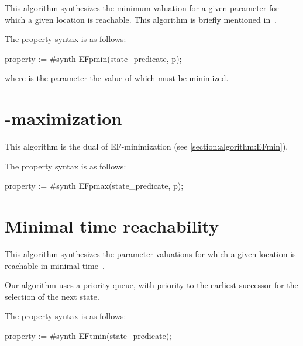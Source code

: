 This algorithm synthesizes the minimum valuation for a given parameter for which a given location is reachable.
This algorithm is briefly mentioned in~\cite{ABPV19}.

The property syntax is as follows:

\begin{IMITATORproperty}
property := #synth EFpmin(state_predicate, p);
\end{IMITATORproperty}

where  is the parameter the value of which must be minimized.



\section{-maximization}\label{section:algorithm:EFmax}

This algorithm is the dual of EF-minimization (see \cref{section:algorithm:EFmin}).

The property syntax is as follows:

\begin{IMITATORproperty}
property := #synth EFpmax(state_predicate, p);
\end{IMITATORproperty}


\section{Minimal time reachability}\label{section:algorithm:EFopt}

This algorithm synthesizes the parameter valuations for which a given location is reachable in minimal time~\cite{ABPV19}.

Our algorithm uses a priority queue, with priority to the earliest successor for the selection of the next state.


The property syntax is as follows:

\begin{IMITATORproperty}
property := #synth EFtmin(state_predicate);
\end{IMITATORproperty}

